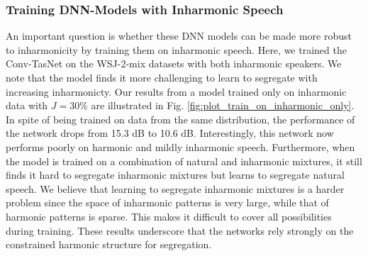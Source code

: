 \documentclass{article}
\begin{document}
\subsubsection{Training DNN-Models with Inharmonic Speech}
\vspace*{-1mm}
\begin{comment}
An important question is whether these DNN models can be made more robust to inharmonicity by training them on inharmonic speech. Here, we trained the Conv-TasNet on the WSJ-2-mix datasets with both inharmonic speakers. We note that the model finds it more challenging to learn to perform segregation with increasing inharmonicty. Our results from a model trained only on inharmonic data with $J=30\%$ are illustrated in Fig. \ref{fig:plot_train_on_inharmonic_only}. In spite of being trained on data from the same distribution, the performance of the network drops from 15.3 dB to 10.6 dB, indicating that \textit{out-of-distribution} data is not the key reason for the degradation illustrated in Fig. \ref{fig:plot_trained_net}. More importantly, this network now performs poorly on harmonic and mildly inharmonic speech. Furthermore, when the model is trained on a combination of natural and inharmonic mixtures, it still finds it hard to segregate inharmonic mixtures but learns to segregate natural speech. These results underscore that the networks rely fundamentally on harmonicity.
\end{comment}
An important question is whether these DNN models can be made more robust to inharmonicity by training them on inharmonic speech. Here, we trained the Conv-TasNet on the WSJ-2-mix datasets with both inharmonic speakers. We note that the model finds it more challenging to learn to segregate with increasing inharmonicty. Our results from a model trained only on inharmonic data with $J=30\%$ are illustrated in Fig. \ref{fig:plot_train_on_inharmonic_only}. In spite of being trained on data from the same distribution, the performance of the network drops from 15.3 dB to 10.6 dB. Interestingly, this network now performs poorly on harmonic and mildly inharmonic speech. Furthermore, when the model is trained on a combination of natural and inharmonic mixtures, it still finds it hard to segregate inharmonic mixtures but learns to segregate natural speech. We believe that learning to segregate inharmonic mixtures is a harder problem since the space of inharmonic patterns is very large, while that of harmonic patterns is sparse. This makes it difficult to cover all possibilities during training. These results underscore that the networks rely strongly on the constrained harmonic structure for segregation.
\end{document}
